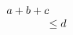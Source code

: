 \documentclass{article}
\begin{document}
\begin{equation}
\begin{array}{ll}\lefteqn{a+b+c}\hspace{1cm}&\\& \le d
\end{array}
\end{equation}
\end{document}
